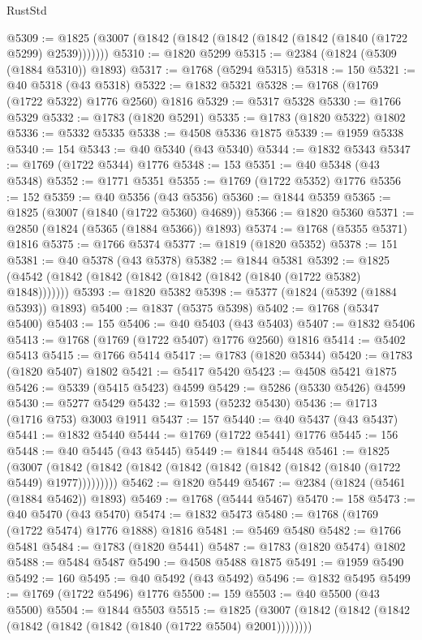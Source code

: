 \begin{lexlean}{RustStd}
\begin{coremodule}
{\begin{coremodule}
{{{{{{{{{{{{{{{{{{{{{{{{{{{{{{{{{{{{{{{{{{{{{{{@5309 := @1825 (@3007 (@1842 (@1842 (@1842 (@1842 (@1842 (@1840 (@1722 @5299) @2539)))))))
@5310 := @1820 @5299
@5315 := @2384 (@1824 (@5309 (@1884 @5310)) @1893)
@5317 := @1768 (@5294 @5315)
@5318 := 150
@5321 := @40 @5318 (@43 @5318)
@5322 := @1832 @5321
@5328 := @1768 (@1769 (@1722 @5322) @1776 @2560) @1816
@5329 := @5317 @5328
@5330 := @1766 @5329
@5332 := @1783 (@1820 @5291)
@5335 := @1783 (@1820 @5322) @1802
@5336 := @5332 @5335
@5338 := @4508 @5336 @1875
@5339 := @1959 @5338
@5340 := 154
@5343 := @40 @5340 (@43 @5340)
@5344 := @1832 @5343
@5347 := @1769 (@1722 @5344) @1776
@5348 := 153
@5351 := @40 @5348 (@43 @5348)
@5352 := @1771 @5351
@5355 := @1769 (@1722 @5352) @1776
@5356 := 152
@5359 := @40 @5356 (@43 @5356)
@5360 := @1844 @5359
@5365 := @1825 (@3007 (@1840 (@1722 @5360) @4689))
@5366 := @1820 @5360
@5371 := @2850 (@1824 (@5365 (@1884 @5366)) @1893)
@5374 := @1768 (@5355 @5371) @1816
@5375 := @1766 @5374
@5377 := @1819 (@1820 @5352)
@5378 := 151
@5381 := @40 @5378 (@43 @5378)
@5382 := @1844 @5381
@5392 := @1825 (@4542 (@1842 (@1842 (@1842 (@1842 (@1842 (@1840 (@1722 @5382) @1848)))))))
@5393 := @1820 @5382
@5398 := @5377 (@1824 (@5392 (@1884 @5393)) @1893)
@5400 := @1837 (@5375 @5398)
@5402 := @1768 (@5347 @5400)
@5403 := 155
@5406 := @40 @5403 (@43 @5403)
@5407 := @1832 @5406
@5413 := @1768 (@1769 (@1722 @5407) @1776 @2560) @1816
@5414 := @5402 @5413
@5415 := @1766 @5414
@5417 := @1783 (@1820 @5344)
@5420 := @1783 (@1820 @5407) @1802
@5421 := @5417 @5420
@5423 := @4508 @5421 @1875
@5426 := @5339 (@5415 @5423) @4599
@5429 := @5286 (@5330 @5426) @4599
@5430 := @5277 @5429
@5432 := @1593 (@5232 @5430)
@5436 := @1713 (@1716 @753) @3003 @1911
@5437 := 157
@5440 := @40 @5437 (@43 @5437)
@5441 := @1832 @5440
@5444 := @1769 (@1722 @5441) @1776
@5445 := 156
@5448 := @40 @5445 (@43 @5445)
@5449 := @1844 @5448
@5461 := @1825
    (@3007 (@1842 (@1842 (@1842 (@1842 (@1842 (@1842 (@1842 (@1840 (@1722 @5449) @1977)))))))))
@5462 := @1820 @5449
@5467 := @2384 (@1824 (@5461 (@1884 @5462)) @1893)
@5469 := @1768 (@5444 @5467)
@5470 := 158
@5473 := @40 @5470 (@43 @5470)
@5474 := @1832 @5473
@5480 := @1768 (@1769 (@1722 @5474) @1776 @1888) @1816
@5481 := @5469 @5480
@5482 := @1766 @5481
@5484 := @1783 (@1820 @5441)
@5487 := @1783 (@1820 @5474) @1802
@5488 := @5484 @5487
@5490 := @4508 @5488 @1875
@5491 := @1959 @5490
@5492 := 160
@5495 := @40 @5492 (@43 @5492)
@5496 := @1832 @5495
@5499 := @1769 (@1722 @5496) @1776
@5500 := 159
@5503 := @40 @5500 (@43 @5500)
@5504 := @1844 @5503
@5515 := @1825 (@3007 (@1842 (@1842 (@1842 (@1842 (@1842 (@1842 (@1840 (@1722 @5504) @2001))))))))
}}}}}}}}}}}}}}}}}}}}}}}}}}}}}}}}}}}}}}}}}}}}}}}
\end{coremodule}}
\end{coremodule}
\end{lexlean}
